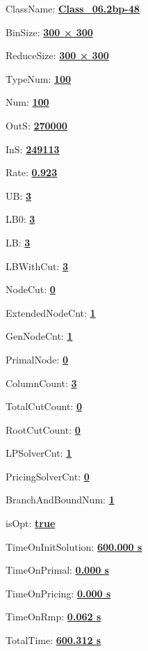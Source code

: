 \documentclass[11pt]{article}
\begin{document}
\pagestyle{empty}


ClassName: \underline{\textbf{Class_06.2bp-48}}
\par
BinSize: \underline{\textbf{300 × 300}}
\par
ReduceSize: \underline{\textbf{300 × 300}}
\par
TypeNum: \underline{\textbf{100}}
\par
Num: \underline{\textbf{100}}
\par
OutS: \underline{\textbf{270000}}
\par
InS: \underline{\textbf{249113}}
\par
Rate: \underline{\textbf{0.923}}
\par
UB: \underline{\textbf{3}}
\par
LB0: \underline{\textbf{3}}
\par
LB: \underline{\textbf{3}}
\par
LBWithCut: \underline{\textbf{3}}
\par
NodeCut: \underline{\textbf{0}}
\par
ExtendedNodeCnt: \underline{\textbf{1}}
\par
GenNodeCnt: \underline{\textbf{1}}
\par
PrimalNode: \underline{\textbf{0}}
\par
ColumnCount: \underline{\textbf{3}}
\par
TotalCutCount: \underline{\textbf{0}}
\par
RootCutCount: \underline{\textbf{0}}
\par
LPSolverCnt: \underline{\textbf{1}}
\par
PricingSolverCnt: \underline{\textbf{0}}
\par
BranchAndBoundNum: \underline{\textbf{1}}
\par
isOpt: \underline{\textbf{true}}
\par
TimeOnInitSolution: \underline{\textbf{600.000 s}}
\par
TimeOnPrimal: \underline{\textbf{0.000 s}}
\par
TimeOnPricing: \underline{\textbf{0.000 s}}
\par
TimeOnRmp: \underline{\textbf{0.062 s}}
\par
TotalTime: \underline{\textbf{600.312 s}}
\par
\newpage
\end{document}
